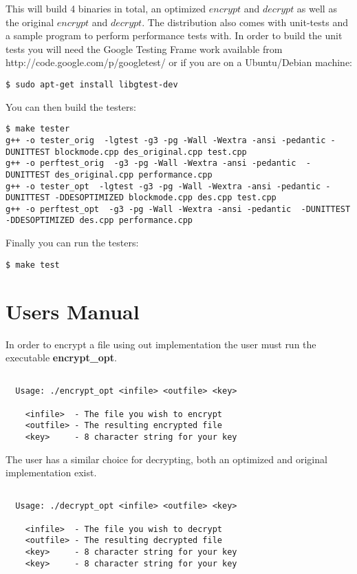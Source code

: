 \documentclass[10pt]{article}
\begin{document}
  This will build 4 binaries in total, an optimized $encrypt$ and $decrypt$ as well as the original $encrypt$ and $decrypt$.
  The distribution also comes with unit-tests and a sample program to perform performance tests with.
  In order to build the unit tests you will need the Google Testing Frame work available from http://code.google.com/p/googletest/ or if you are
  on a Ubuntu/Debian machine:

{\footnotesize
\begin{verbatim}
$ sudo apt-get install libgtest-dev
\end{verbatim}
}

You can then build the testers:

{\footnotesize
\begin{verbatim}
$ make tester
g++ -o tester_orig  -lgtest -g3 -pg -Wall -Wextra -ansi -pedantic -DUNITTEST blockmode.cpp des_original.cpp test.cpp
g++ -o perftest_orig  -g3 -pg -Wall -Wextra -ansi -pedantic  -DUNITTEST des_original.cpp performance.cpp
g++ -o tester_opt  -lgtest -g3 -pg -Wall -Wextra -ansi -pedantic -DUNITTEST -DDESOPTIMIZED blockmode.cpp des.cpp test.cpp
g++ -o perftest_opt  -g3 -pg -Wall -Wextra -ansi -pedantic  -DUNITTEST -DDESOPTIMIZED des.cpp performance.cpp
\end{verbatim}
}

Finally you can run the testers:

{\footnotesize
\begin{verbatim}
$ make test
\end{verbatim}
}

\section{Users Manual}

In order to encrypt a file using out implementation the user must run the executable \textbf{encrypt\_opt}.
\begin{verbatim}

  Usage: ./encrypt_opt <infile> <outfile> <key>

    <infile>  - The file you wish to encrypt
    <outfile> - The resulting encrypted file
    <key>     - 8 character string for your key

\end{verbatim}

The user has a similar choice for decrypting, both an optimized and original implementation exist.
\begin{verbatim}

  Usage: ./decrypt_opt <infile> <outfile> <key>

    <infile>  - The file you wish to decrypt
    <outfile> - The resulting decrypted file
    <key>     - 8 character string for your key
    <key>     - 8 character string for your key

\end{verbatim}
\end{document}
